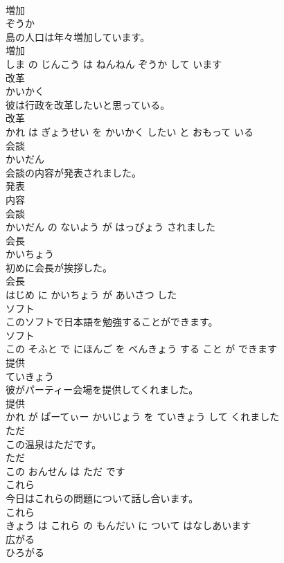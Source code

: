 \documentclass[8pt]{extreport}
\begin{document}
\begin{CJK}{UTF8}{min}
\\	増加	
\\	ぞうか			
\\	島の人口は年々増加しています。	
\\	増加 
\\	しま の じんこう は ねんねん ぞうか して います			
\\	改革	
\\	かいかく			
\\	彼は行政を改革したいと思っている。	
\\	改革 
\\	かれ は ぎょうせい を かいかく したい と おもって いる			
\\	会談	
\\	かいだん			
\\	会談の内容が発表されました。	
\\	発表 
\\	内容 
\\	会談 
\\	かいだん の ないよう が はっぴょう されました			
\\	会長	
\\	かいちょう			
\\	初めに会長が挨拶した。	
\\	会長 
\\	はじめ に かいちょう が あいさつ した			
\\	ソフト	
\\	このソフトで日本語を勉強することができます。	
\\	ソフト 
\\	この そふと で にほんご を べんきょう する こと が できます			
\\	提供	
\\	ていきょう			
\\	彼がパーティー会場を提供してくれました。	
\\	提供 
\\	かれ が ぱーてぃー かいじょう を ていきょう して くれました			
\\	ただ	
\\	この温泉はただです。	
\\	ただ 
\\	この おんせん は ただ です			
\\	これら	
\\	今日はこれらの問題について話し合います。	
\\	これら 
\\	きょう は これら の もんだい に ついて はなしあいます			
\\	広がる	
\\	ひろがる			

\end{CJK}
\end{document}
